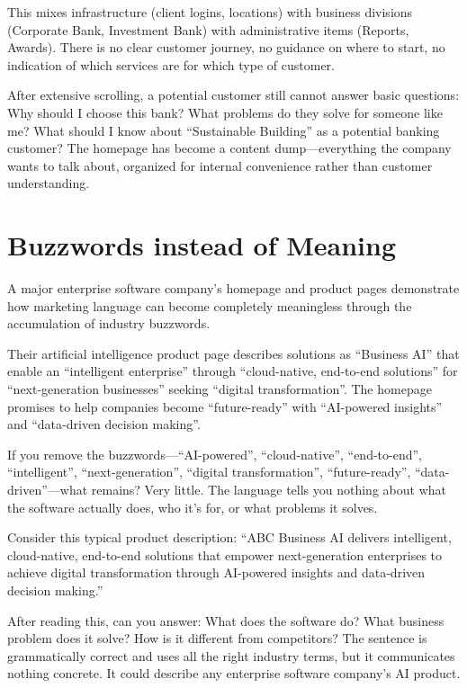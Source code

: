 This mixes infrastructure (client logins, locations) with business divisions (Corporate Bank, Investment Bank) with administrative items (Reports, Awards). There is no clear customer journey, no guidance on where to start, no indication of which services are for which type of customer.

After extensive scrolling, a potential customer still cannot answer basic questions: Why should I choose this bank? What problems do they solve for someone like me? What should I know about ``Sustainable Building'' as a potential banking customer? The homepage has become a content dump—everything the company wants to talk about, organized for internal convenience rather than customer understanding.

\section{Buzzwords instead of Meaning}

A major enterprise software company's homepage and product pages demonstrate how marketing language can become completely meaningless through the accumulation of industry buzzwords.

Their artificial intelligence product page describes solutions as ``Business AI'' that enable an ``intelligent enterprise'' through ``cloud-native, end-to-end solutions'' for ``next-generation businesses'' seeking ``digital transformation''. The homepage promises to help companies become ``future-ready'' with ``AI-powered insights'' and ``data-driven decision making''.

If you remove the buzzwords—``AI-powered'', ``cloud-native'', ``end-to-end'', ``intelligent'', ``next-generation'', ``digital transformation'', ``future-ready'', ``data-driven''—what remains? Very little. The language tells you nothing about what the software actually does, who it's for, or what problems it solves.

Consider this typical product description: ``ABC Business AI delivers intelligent, cloud-native, end-to-end solutions that empower next-generation enterprises to achieve digital transformation through AI-powered insights and data-driven decision making.''

After reading this, can you answer: What does the software do? What business problem does it solve? How is it different from competitors? The sentence is grammatically correct and uses all the right industry terms, but it communicates nothing concrete. It could describe any enterprise software company's AI product.

